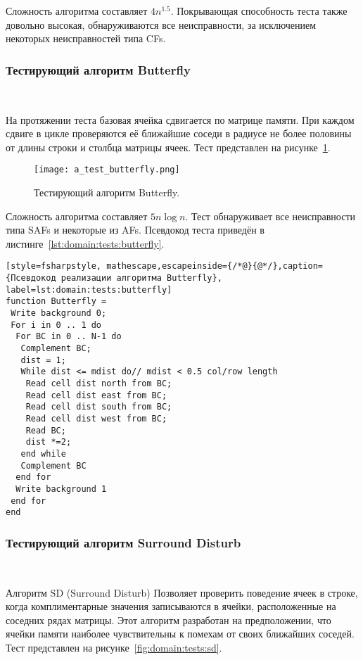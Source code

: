 Сложность алгоритма составляет $ 4n^{1.5} $. Покрывающая способность теста также довольно высокая, обнаруживаются все неисправности, за исключением некоторых неисправностей типа CFs.

\subsubsection{Тестирующий алгоритм Butterfly}~\\
\label{sub:domain:tests:butterfly}

На протяжении теста базовая ячейка сдвигается по матрице памяти. При каждом сдвиге в цикле проверяются её ближайшие соседи в радиусе не более половины от длины строки и столбца матрицы ячеек. Тест представлен на рисунке~\ref{fig:domain:tests:butterfly}. 

\begin{figure}[ht]
\centering
  \texttt{[image: a\_test\_butterfly.png]}  
  \caption{ Тестирующий алгоритм Butterfly. }
  \label{fig:domain:tests:butterfly}
\end{figure} 

Сложность алгоритма составляет $ 5n \log n $. Тест обнаруживает все неисправности типа SAFs и некоторые из AFs. Псевдокод теста приведён в листинге~\ref{lst:domain:tests:butterfly}.

\begin{lstlisting}[style=fsharpstyle, mathescape,escapeinside={/*@}{@*/},caption={Псевдокод реализации алгоритма Butterfly}, label=lst:domain:tests:butterfly]
function Butterfly =
 Write background 0;
 For i in 0 .. 1 do
  For BC in 0 .. N-1 do
   Complement BC;
   dist = 1; 
   While dist <= mdist do// mdist < 0.5 col/row length
    Read cell dist north from BC;
    Read cell dist east from BC;
    Read cell dist south from BC;
    Read cell dist west from BC;
    Read BC; 
    dist *=2;
   end while
   Complement BC
  end for
  Write background 1
 end for
end
\end{lstlisting}

\subsubsection{Тестирующий алгоритм Surround Disturb}~\\
\label{sub:domain:tests:sd}

Алгоритм SD (Surround Disturb) Позволяет проверить поведение ячеек в строке, когда комплиментарные значения записываются в ячейки, расположенные на соседних рядах матрицы. Этот алгоритм разработан на предположении, что ячейки памяти наиболее чувствительны к помехам от своих ближайших соседей. Тест представлен на рисунке~\ref{fig:domain:tests:sd}. 


